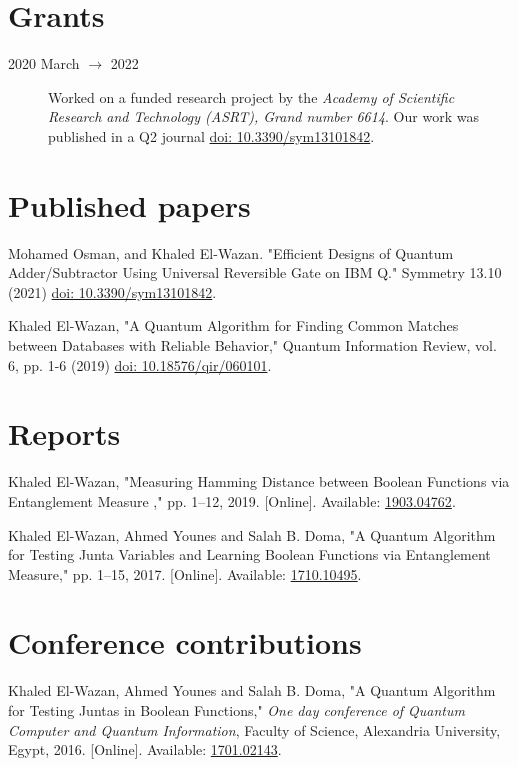 \documentclass[margin,line]{resume}
\newcommand*{\doi}[1]{\href{http://dx.doi.org/#1}{doi: #1}}
\begin{document}
\begin{resume}
\begin{description}
    \end{description}

\section{\mysidestyle Grants}
\begin{description}
    \item[2020 March $\rightarrow$ 2022] Worked on a funded research project by the \textit{Academy of Scientific Research and Technology (ASRT), Grand number 6614}. Our work was published in a Q2 journal \doi{10.3390/sym13101842}.
\end{description}


\section{ \mysidestyle Published papers}

Mohamed Osman, and Khaled El-Wazan. "Efficient Designs of Quantum Adder/Subtractor Using Universal Reversible Gate on IBM Q." Symmetry 13.10 (2021) \doi{10.3390/sym13101842}.
    
    
Khaled El-Wazan, "A Quantum Algorithm for Finding Common Matches between Databases with Reliable Behavior," Quantum Information Review, vol. 6, pp. 1-6 (2019) \doi{10.18576/qir/060101}.


\section{\mysidestyle Reports}

Khaled El-Wazan, "Measuring Hamming Distance between Boolean Functions via Entanglement Measure ,"  pp. 1--12, 2019. 
[Online]. Available: \href{http://arxiv.org/abs/1903.04762}{1903.04762}.



Khaled El-Wazan, Ahmed Younes and Salah B. Doma, "A Quantum Algorithm for Testing Junta Variables and Learning Boolean Functions via Entanglement Measure,"  pp. 1--15, 2017. 
[Online]. Available: \href{http://arxiv.org/abs/1710.10495}{1710.10495}.



\section{ \mysidestyle Conference contributions}


Khaled El-Wazan, Ahmed Younes and Salah B. Doma, "A Quantum Algorithm for Testing Juntas in Boolean Functions," \textit{One day conference of Quantum Computer and Quantum Information}, Faculty of Science, Alexandria University, Egypt, 2016. [Online]. Available: \href{http://arxiv.org/abs/1701.02143}{1701.02143}.



\end{resume}
\end{document}
